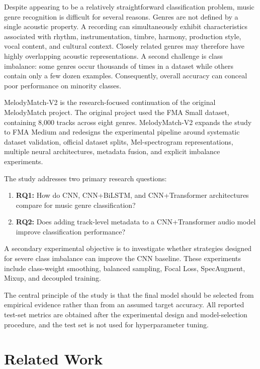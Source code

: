 \documentclass[11pt,a4paper]{article}
\begin{document}
Despite appearing to be a relatively straightforward classification problem, music genre recognition is difficult for several reasons. Genres are not defined by a single acoustic property. A recording can simultaneously exhibit characteristics associated with rhythm, instrumentation, timbre, harmony, production style, vocal content, and cultural context. Closely related genres may therefore have highly overlapping acoustic representations. A second challenge is class imbalance: some genres occur thousands of times in a dataset while others contain only a few dozen examples. Consequently, overall accuracy can conceal poor performance on minority classes.

MelodyMatch-V2 is the research-focused continuation of the original MelodyMatch project. The original project used the FMA Small dataset, containing 8,000 tracks across eight genres. MelodyMatch-V2 expands the study to FMA Medium and redesigns the experimental pipeline around systematic dataset validation, official dataset splits, Mel-spectrogram representations, multiple neural architectures, metadata fusion, and explicit imbalance experiments.

The study addresses two primary research questions:

\begin{enumerate}
    \item \textbf{RQ1:} How do CNN, CNN+BiLSTM, and CNN+Transformer architectures compare for music genre classification?
    \item \textbf{RQ2:} Does adding track-level metadata to a CNN+Transformer audio model improve classification performance?
\end{enumerate}

A secondary experimental objective is to investigate whether strategies designed for severe class imbalance can improve the CNN baseline. These experiments include class-weight smoothing, balanced sampling, Focal Loss, SpecAugment, Mixup, and decoupled training.

The central principle of the study is that the final model should be selected from empirical evidence rather than from an assumed target accuracy. All reported test-set metrics are obtained after the experimental design and model-selection procedure, and the test set is not used for hyperparameter tuning.

\section{Related Work}
\end{document}
